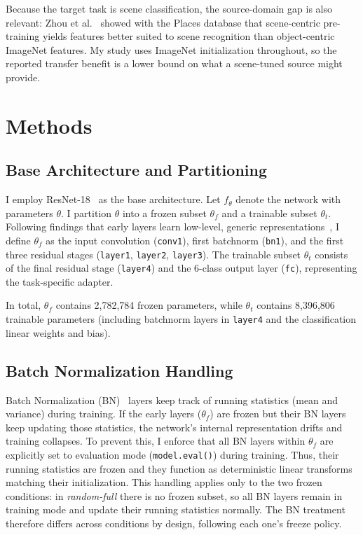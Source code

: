 \documentclass[conference]{IEEEtran}
\begin{document}
Because the target task is scene classification, the source-domain gap is also relevant: Zhou et al.~\cite{zhou2014places} showed with the Places database that scene-centric pre-training yields features better suited to scene recognition than object-centric ImageNet features. My study uses ImageNet initialization throughout, so the reported transfer benefit is a lower bound on what a scene-tuned source might provide.

\section{Methods}
\subsection{Base Architecture and Partitioning}
I employ ResNet-18~\cite{he2016deep} as the base architecture. Let $f_\theta$ denote the network with parameters $\theta$. I partition $\theta$ into a frozen subset $\theta_f$ and a trainable subset $\theta_t$. 
Following findings that early layers learn low-level, generic representations~\cite{yosinski2014transferable}, I define $\theta_f$ as the input convolution (\texttt{conv1}), first batchnorm (\texttt{bn1}), and the first three residual stages (\texttt{layer1}, \texttt{layer2}, \texttt{layer3}). The trainable subset $\theta_t$ consists of the final residual stage (\texttt{layer4}) and the 6-class output layer (\texttt{fc}), representing the task-specific adapter. 

In total, $\theta_f$ contains 2,782,784 frozen parameters, while $\theta_t$ contains 8,396,806 trainable parameters (including batchnorm layers in \texttt{layer4} and the classification linear weights and bias).

\subsection{Batch Normalization Handling}
Batch Normalization (BN)~\cite{ioffe2015batch} layers keep track of running statistics (mean and variance) during training. If the early layers ($\theta_f$) are frozen but their BN layers keep updating those statistics, the network's internal representation drifts and training collapses.
To prevent this, I enforce that all BN layers within $\theta_f$ are explicitly set to evaluation mode (\texttt{model.eval()}) during training. Thus, their running statistics are frozen and they function as deterministic linear transforms matching their initialization. This handling applies only to the two frozen conditions: in \textit{random-full} there is no frozen subset, so all BN layers remain in training mode and update their running statistics normally. The BN treatment therefore differs across conditions by design, following each one's freeze policy.
\end{document}
